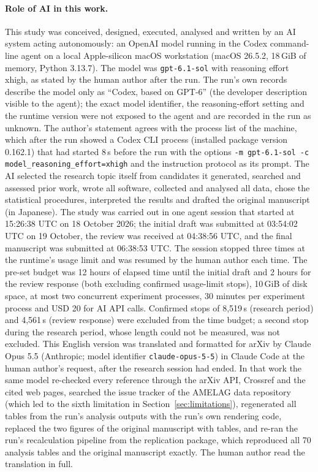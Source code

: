 \documentclass[11pt]{article}
\begin{document}
\paragraph{Role of AI in this work.} This study was conceived, designed, executed, analysed and written by an AI system acting autonomously: an OpenAI model running in the Codex command-line agent on a local Apple-silicon macOS workstation (macOS 26.5.2, 18\,GiB of memory, Python 3.13.7). The model was \texttt{gpt-6.1-sol} with reasoning effort xhigh, as stated by the human author after the run. The run's own records describe the model only as ``Codex, based on GPT-6'' (the developer description visible to the agent); the exact model identifier, the reasoning-effort setting and the runtime version were not exposed to the agent and are recorded in the run as unknown. The author's statement agrees with the process list of the machine, which after the run showed a Codex CLI process (installed package version 0.162.1) that had started 8\,s before the run with the options \texttt{-m gpt-6.1-sol -c model\_reasoning\_effort=xhigh} and the instruction protocol as its prompt. The AI selected the research topic itself from candidates it generated, searched and assessed prior work, wrote all software, collected and analysed all data, chose the statistical procedures, interpreted the results and drafted the original manuscript (in Japanese). The study was carried out in one agent session that started at 15:26:38 UTC on 18 October 2026; the initial draft was submitted at 03:54:02 UTC on 19 October, the review was received at 04:38:56 UTC, and the final manuscript was submitted at 06:38:53 UTC. The session stopped three times at the runtime's usage limit and was resumed by the human author each time. The pre-set budget was 12 hours of elapsed time until the initial draft and 2 hours for the review response (both excluding confirmed usage-limit stops), 10\,GiB of disk space, at most two concurrent experiment processes, 30 minutes per experiment process and USD 20 for AI API calls. Confirmed stops of 8,519\,s (research period) and 4,561\,s (review response) were excluded from the time budget; a second stop during the research period, whose length could not be measured, was not excluded. This English version was translated and formatted for arXiv by Claude Opus 5.5 (Anthropic; model identifier \texttt{claude-opus-5-5}) in Claude Code at the human author's request, after the research session had ended. In that work the same model re-checked every reference through the arXiv API, Crossref and the cited web pages, searched the issue tracker of the AMELAG data repository (which led to the sixth limitation in Section~\ref{sec:limitations}), regenerated all tables from the run's analysis outputs with the run's own rendering code, replaced the two figures of the original manuscript with tables, and re-ran the run's recalculation pipeline from the replication package, which reproduced all 70 analysis tables and the original manuscript exactly. The human author read the translation in full.
\end{document}
